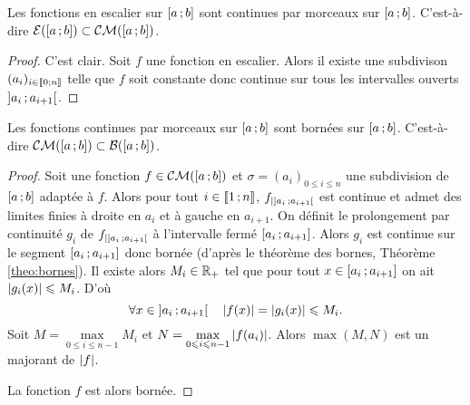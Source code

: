 \begin{prop}
  Les fonctions en escalier sur \(\left[ a \, ;  b \right]\) sont continues par morceaux sur \(\left[ a \, ;  b \right]\). C'est-à-dire \(\mathcal{E}(\left[ a \, ;  b \right]) \subset \mathcal{CM}(\left[ a \, ;  b \right])\).
\end{prop}
\begin{proof}
  C'est clair. Soit \(f\) une fonction en escalier. Alors il existe une subdivison \((a_i)_{i \in \mathopen{\llbracket}0\mathclose{}\mathpunct{};n\mathclose{\rrbracket}}\) telle que \(f\) soit constante donc continue sur tous les intervalles ouverts \(\left] a_i \, ;  a_{i+1} \right[\).
\end{proof}

\begin{prop}
  Les fonctions continues par morceaux sur \(\left[ a \, ;  b \right]\) sont bornées sur \(\left[ a \, ;  b \right]\). C'est-à-dire \(\mathcal{CM}(\left[ a \, ;  b \right]) \subset \mathcal{B}(\left[ a \, ;  b \right])\).
\end{prop}
\begin{proof}
  Soit une fonction \(f \in \mathcal{CM}(\left[ a \, ;  b \right])\) et \(\sigma=(a_i)_{0 \leqslant i \leqslant n}\) une subdivision de \(\left[ a \, ;  b \right]\) adaptée à \(f\). Alors pour tout \(i \in \mathopen{\llbracket}1\mathclose{}\mathpunct{};n\mathclose{\rrbracket}\), \(f_{|\left] a_i \, ;  a_{i+1} \right[}\) est continue et admet des limites finies à droite en \(a_{i}\) et à gauche en \(a_{i+1}\). On définit le prolongement par continuité \(g_i\) de \(f_{|\left] a_i \, ;  a_{i+1} \right[}\) à l'intervalle fermé \(\left[ a_i \, ;  a_{i+1} \right]\). Alors \(g_i\) est continue sur le segment \(\left[ a_i \, ;  a_{i+1} \right]\) donc bornée (d'après le théorème des bornes, Théorème \ref{theo:bornes}). Il existe alors \(M_i \in \mathbb{R}_+\) tel que pour tout \(x \in \left[ a_i \, ;  a_{i+1} \right] \) on ait \(\left\lvert g_i(x)\right\rvert \leqslant M_i\). D'où
  \begin{equation}
    \forall x \in \left] a_i \, ;  a_{i+1} \right[ \quad \left\lvert f(x)\right\rvert=\left\lvert g_i(x)\right\rvert \leqslant M_i.
  \end{equation}
  Soit \(M=\max\limits_{0 \leqslant i \leqslant n-1} M_i\) et \(N=\max\limits_{0 \leqslant i \leqslant n-1} \left\lvert f(a_i)\right\rvert\). Alors \(\max(M,N)\) est un majorant de \(\left\lvert f\right\rvert\).

  La fonction \(f\) est alors bornée.
\end{proof}

